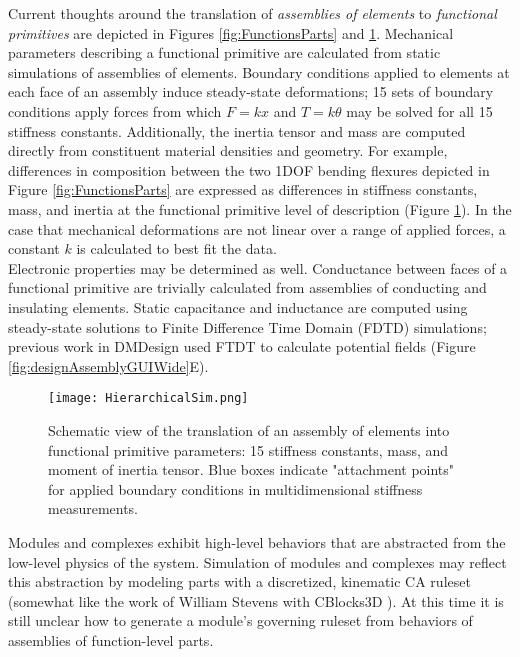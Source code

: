 {Current thoughts around the translation of \textit{assemblies of elements} to \textit{functional primitives} are depicted in Figures \ref{fig:FunctionsParts} and \ref{fig:HierarchicalSim}.  Mechanical parameters describing a functional primitive are calculated from static simulations of assemblies of elements.  Boundary conditions applied to elements at each face of an assembly induce steady-state deformations; 15 sets of boundary conditions apply forces from which $F = kx$ and $T = k\theta$ may be solved for all 15 stiffness constants.  Additionally, the inertia tensor and mass are computed directly from constituent material densities and geometry.  For example, differences in composition between the two 1DOF bending flexures depicted in Figure \ref{fig:FunctionsParts} are expressed as differences in stiffness constants, mass, and inertia at the functional primitive level of description (Figure \ref{fig:HierarchicalSim}).  In the case that mechanical deformations are not linear over a range of applied forces, a constant $k$ is calculated to best fit the data.  \\

Electronic properties may be determined as well.  Conductance between faces of a functional primitive are trivially calculated from assemblies of conducting and insulating elements.  Static capacitance and inductance are computed using steady-state solutions to Finite Difference Time Domain (FDTD) simulations; previous work in DMDesign used FTDT to calculate potential fields (Figure \ref{fig:designAssemblyGUIWide}E).\\

\begin{figure}
  \texttt{[image: HierarchicalSim.png]}
  \caption{Schematic view of the translation of an assembly of elements into functional primitive parameters: 15 stiffness constants, mass, and moment of inertia tensor.  Blue boxes indicate "attachment points" for applied boundary conditions in multidimensional stiffness measurements.}
  \label{fig:HierarchicalSim}
\end{figure}

Modules and complexes exhibit high-level behaviors that are abstracted from the low-level physics of the system.  Simulation of modules and complexes may reflect this abstraction by modeling parts with a discretized, kinematic CA ruleset (somewhat like the work of William Stevens with CBlocks3D \cite{Stevens2009b}).  At this time it is still unclear how to generate a module's governing ruleset from behaviors of assemblies of function-level parts.

}
